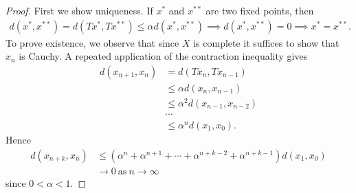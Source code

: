 \documentclass[12pt,reqno]{amsart}
\numberwithin{equation}{section}  %
\numberwithin{figure}{section}
\theoremstyle{plain}
\theoremstyle{definition}
\theoremstyle{remark}
\begin{document}
  \begin{proof} First we show uniqueness. If $x^*$ and $x^{**}$ are two fixed
	points, then
	\begin{equation*}
		\begin{split}
			d(x^*, x^{**}) = d(Tx^*, Tx^{**}) \le \alpha d(x^*, x^{**}) \implies d(x^*,
			x^{**}) = 0 \implies x^* = x^{**}.
		\end{split}
	\end{equation*}
To prove existence, we observe that since $X$ is complete it suffices to show
that $x_n$ is Cauchy. A repeated application of the
contraction inequality gives
%
%
\begin{equation*}
	\begin{split}
		d\left( x_{n+1},x_n \right)
		& = d\left( Tx_n, Tx_{n-1} \right)
		\\
		& \le \alpha d\left( x_n, x_{n-1} \right)
		\\
		& \le \alpha^2 d\left( x_{n-1}, x_{n-2} \right)
		\\
		& \cdots
		\\
		& \le \alpha^n d\left( x_1, x_0 \right).
	\end{split}
\end{equation*}
%
%
Hence
%
%
\begin{equation*}
\begin{split}
  d\left( x_{n+k},x_n \right)
  & \le (\alpha^{n } +\alpha^{n+1} + \cdots +
  \alpha^{n+k-2} + \alpha^{n+k-1})d(x_{1}, x_{0}) 
  \\
  & \to 0 \ \text{as} \ n \to \infty
\end{split}
\end{equation*}
%
%
since $0 < \alpha < 1$. 
\end{proof}
%
%
%
%
%
%
%
\end{document}
